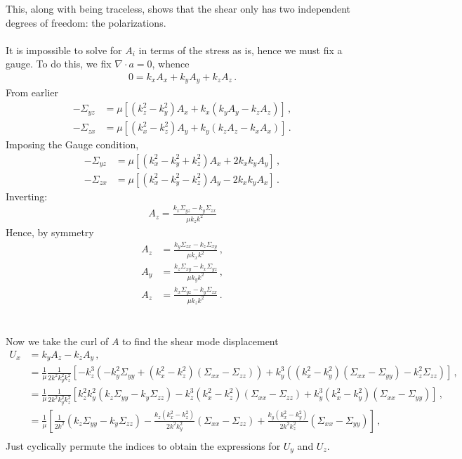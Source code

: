 \documentclass{article}
\newcommand*\p[1]{\left(#1\right)}
\newcommand*\ps[1]{\left[#1\right]}
\newcommand*\f[2]{\frac{#1}{#2}}
\begin{document}
This, along with being traceless, shows that the shear only has two independent degrees of freedom: the polarizations.
\\\\
It is impossible to solve for $A_i$ in terms of the stress as is, hence we must fix a gauge. To do this, we fix $\nabla\cdot a=0$, whence
\begin{align}
0=k_xA_x+k_yA_y+k_zA_z\,.
\end{align}
From earlier
\begin{align}
-\Sigma_{yz}&=\mu\ps{(k_z^2-k_y^2) A_x+k_x(k_y A_y-k_z A_z)}\,,\\
-\Sigma_{zx}&=\mu\ps{(k_x^2-k_z^2) A_y+k_y(k_z A_z-k_x A_x)}\,.
\end{align}
Imposing the Gauge condition,
\begin{align}
-\Sigma_{yz}&=\mu\ps{(k_x^2-k_y^2+k_z^2) A_x+2k_xk_y A_y}\,,\\
-\Sigma_{zx}&=\mu\ps{(k_x^2-k_y^2-k_z^2) A_y-2k_x k_y A_x}\,.
\end{align}
Inverting:
\begin{align}
A_z=\f{k_x\Sigma_{yz}-k_y\Sigma_{zx}}{\mu k_z k^2}
\end{align}
Hence, by symmetry
\begin{align}
A_z&=\f{k_y\Sigma_{zx}-k_z\Sigma_{xy}}{\mu k_x k^2}\,,\\
A_y&=\f{k_z\Sigma_{xy}-k_x\Sigma_{yz}}{\mu k_y k^2}\,,\\
A_z&=\f{k_x\Sigma_{yz}-k_y\Sigma_{zx}}{\mu k_z k^2}\,.
\end{align}
\\\\
Now we take the curl of $A$ to find the shear mode displacement
\begin{align}
U_x&=k_y A_z-k_z A_y\,,\\
&=\f1\mu\f{1}{2k^2k_y^2k_z^2}\ps{-k_z^3\p{-k_y^2\Sigma_{yy}+(k_x^2-k_z^2)(\Sigma_{xx}-\Sigma_{zz})}+k_y^3\p{(k_x^2-k_y^2)(\Sigma_{xx}-\Sigma_{yy})-k_z^2\Sigma_{zz}}}\,,\\
&=\f1\mu\f{1}{2k^2k_y^2k_z^2}\ps{k_z^2k_y^2(k_z\Sigma_{yy}-k_y\Sigma_{zz})-k_z^3(k_x^2-k_z^2)(\Sigma_{xx}-\Sigma_{zz})+k_y^3(k_x^2-k_y^2)(\Sigma_{xx}-\Sigma_{yy})}\,,\\
&=\f1\mu\ps{\f{1}{2k^2}(k_z\Sigma_{yy}-k_y\Sigma_{zz})-\f{k_z(k_x^2-k_z^2)}{2k^2k_y^2}(\Sigma_{xx}-\Sigma_{zz})+\f{k_y(k_x^2-k_y^2)}{2k^2k_z^2}(\Sigma_{xx}-\Sigma_{yy})}\,,\\
\end{align}
Just cyclically permute the indices to obtain the expressions for $U_y$ and $U_z$.
\end{document}
